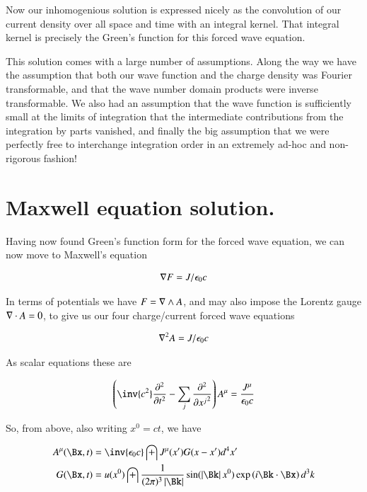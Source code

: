 \documentclass{article}
\newcommand{\PDSq}[2]{\frac{\partial^2 {#2}}{\partial {#1}^2}}
\begin{document}
Now our inhomogenious solution is expressed nicely as the convolution of our current density over all space and time
with an integral kernel.  That integral kernel is precisely the Green's function for this forced wave equation.

This solution comes with a large number of assumptions.  Along the way we have the assumption that both our wave function
and the charge density was Fourier transformable, and that the wave number domain products were inverse transformable.  We
also had an assumption that the
wave function is sufficiently small at the limits of integration that the intermediate contributions from the 
integration by parts vanished, and finally the big assumption that we were perfectly free to interchange integration order
in an extremely ad-hoc and non-rigorous fashion!

\section{ Maxwell equation solution. }

Having now found Green's function form for the forced wave equation, we can now move to Maxwell's equation

\begin{align*}
\nabla F = J/\epsilon_0 c
\end{align*}

In terms of potentials we have $F = \nabla \wedge A$, and may also impose the Lorentz gauge $\nabla \cdot A = 0$, to give us our four charge/current forced wave equations

\begin{align*}
\nabla^2 A = J/\epsilon_0 c
\end{align*}

As scalar equations these are

\begin{align}
\left( \inv{c^2} \PDSq{t}{} -\sum_j \PDSq{x^j}{} \right) A^\mu = \frac{J^\mu}{\epsilon_0 c}
\end{align}

So, from above, also writing $x^0 = ct$, we have

\begin{align}\label{eqn:fourVectorPotentials}
{A^\mu}(\Bx, t)
&= \inv{\epsilon_0 c} \int J^\mu(x') G(x - x') d^4 x' \\
G(\Bx, t)
&= u(x^0) \int
\frac{1}{(2\pi)^3 \Abs{\Bk}}
\sin( \Abs{\Bk} x^0 )
\exp\left( i \Bk \cdot \Bx \right)
d^3 k
\end{align}
\end{document}
